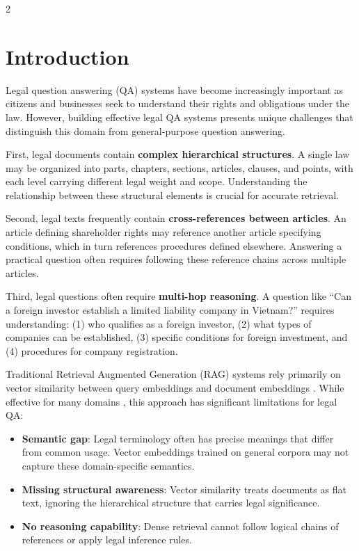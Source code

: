 \documentclass[11pt,a4paper]{article}
\begin{document}
\begin{multicols}{2}

\section{Introduction}

Legal question answering (QA) systems have become increasingly important as citizens and businesses seek to understand their rights and obligations under the law. However, building effective legal QA systems presents unique challenges that distinguish this domain from general-purpose question answering.

First, legal documents contain \textbf{complex hierarchical structures}. A single law may be organized into parts, chapters, sections, articles, clauses, and points, with each level carrying different legal weight and scope. Understanding the relationship between these structural elements is crucial for accurate retrieval.

Second, legal texts frequently contain \textbf{cross-references between articles}. An article defining shareholder rights may reference another article specifying conditions, which in turn references procedures defined elsewhere. Answering a practical question often requires following these reference chains across multiple articles.

Third, legal questions often require \textbf{multi-hop reasoning}. A question like ``Can a foreign investor establish a limited liability company in Vietnam?'' requires understanding: (1) who qualifies as a foreign investor, (2) what types of companies can be established, (3) specific conditions for foreign investment, and (4) procedures for company registration.

Traditional Retrieval Augmented Generation (RAG) \cite{ref2} systems rely primarily on vector similarity between query embeddings and document embeddings \cite{ref_sbert}. While effective for many domains \cite{ref_gao2024,ref_fan2024}, this approach has significant limitations for legal QA:

\begin{itemize}
\item \textbf{Semantic gap}: Legal terminology often has precise meanings that differ from common usage. Vector embeddings trained on general corpora may not capture these domain-specific semantics.
\item \textbf{Missing structural awareness}: Vector similarity treats documents as flat text, ignoring the hierarchical structure that carries legal significance.
\item \textbf{No reasoning capability}: Dense retrieval cannot follow logical chains of references or apply legal inference rules.
\end{itemize}


\end{multicols}
\end{document}
